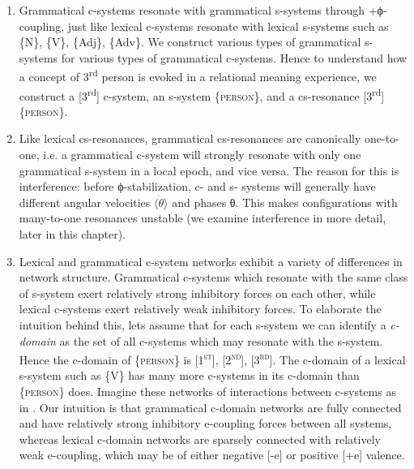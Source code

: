 \begin{enumerate}

\item Grammatical c-systems resonate with grammatical s-systems through +ϕ-coupling, just like lexical c-systems resonate with lexical s-systems such as \{N\}, \{V\}, \{Adj\}, \{Adv\}. We construct various types of grammatical s-systems for various types of grammatical c-systems. Hence to understand how a concept of 3\textsuperscript{rd} person is evoked in a relational meaning experience, we construct a [3\textsuperscript{rd}] c-system, an s-system \{\textsc{person}\}, and a cs-resonance [3\textsuperscript{rd}]\{\textsc{person}\}. 

\item Like lexical cs-resonances, grammatical cs-resonances are canonically one-to-one, i.e. a grammatical c-system will strongly resonate with only one grammatical s-system in a local epoch, and vice versa. The reason for this is interference: before ϕ-stabilization, c- and s- systems will generally have different angular velocities $\langle\dot{\theta}\rangle$ and phases θ. This makes configurations with many-to-one resonances unstable (we examine interference in more detail, later in this chapter).

\item Lexical and grammatical c-system networks exhibit a variety of differences in network structure. Grammatical c-systems which resonate with the same class of s-system exert relatively strong inhibitory forces on each other, while lexical c-systems exert relatively weak inhibitory forces. To elaborate the intuition behind this, lets assume that for each s-system we can identify a \textit{c-domain} as the set of all c-systems which may resonate with the s-system. Hence the c-domain of \{\textsc{person}\} is [1\textsc{\textsuperscript{st}}], [2\textsc{\textsuperscript{nd}}], [3\textsc{\textsuperscript{rd}}]. The c-domain of a lexical s-system such as \{V\} has many more c-systems in its c-domain than \{\textsc{person}\} does. Imagine these networks of interactions between c-systems as in {}. Our intuition is that grammatical c-domain networks are fully connected and have relatively strong inhibitory e-coupling forces between all systems, whereas lexical c-domain networks are sparsely connected with relatively weak e-coupling, which may be of either negative [-e] or positive [+e] valence.


\end{enumerate}
